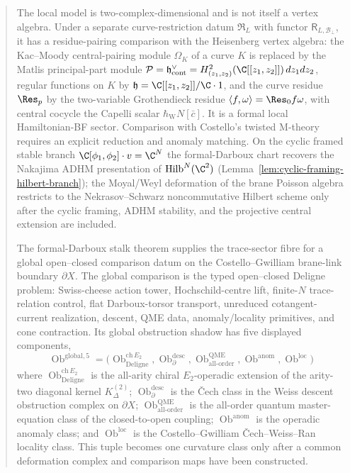 \begin{abstract}
\medskip\noindent
The local model is two-complex-dimensional and is not itself a vertex
algebra.  Under a separate curve-restriction datum
\(\mathfrak R_L\) with functor \(\mathsf R_{L,\mathcal B_\perp}\), it has a
residue-pairing comparison with the Heisenberg vertex algebra: the
Kac--Moody central-pairing module $\Omega_K$ of a curve $K$ is replaced by the Matlis
principal-part module
$\mathcal P=\mathfrak h^\vee_{\mathrm{cont}}=
H^2_{(z_1,z_2)}(\C[[z_1,z_2]])\,dz_1dz_2$, regular functions on $K$
by $\mathfrak h=\C[[z_1,z_2]]/\C\cdot 1$, and the curve residue
$\Res_p$ by the two-variable Grothendieck residue
$\langle f,\omega\rangle=\Res_0 f\omega$, with central cocycle the
Capelli scalar $\hbar_{\mathrm{W}}N[\bar c]$.  It is a formal local
Hamiltonian-BF sector.  Comparison with Costello's twisted M-theory
\cite{costello-twistedM} requires an explicit reduction and anomaly
matching.  On the cyclic framed stable branch
$\C[\phi_1,\phi_2]\cdot v=\C^N$ the formal-Darboux chart recovers
the Nakajima ADHM presentation of $\mathrm{Hilb}^N(\C^2)$
(Lemma~\ref{lem:cyclic-framing-hilbert-branch}); the Moyal/Weyl
deformation of the brane Poisson algebra restricts to the
Nekrasov--Schwarz noncommutative Hilbert scheme
\cite{nekrasov-schwarz-noncommutative} only after the cyclic framing,
ADHM stability, and the projective central extension are included.

\medskip\noindent
The formal-Darboux stalk theorem supplies the trace-sector fibre for a
global open--closed comparison datum on the Costello--Gwilliam
brane-link boundary \(\partial X\).  The global comparison is the typed
open--closed Deligne problem: Swiss-cheese action tower,
Hochschild-centre lift, finite-\(N\) trace-relation control, flat
Darboux-torsor transport, unreduced cotangent-current realization,
descent, QME data, anomaly/locality primitives, and cone contraction.
Its global obstruction shadow has five displayed components,
\[
  \operatorname{Ob}^{\mathrm{global},5}=
  \bigl(
  \operatorname{Ob}^{\mathrm{ch}\,E_2}_{\mathrm{Deligne}},
  \operatorname{Ob}^{\mathrm{desc}}_{\partial},
  \operatorname{Ob}^{\mathrm{QME}}_{\mathrm{all\mbox{-}order}},
  \operatorname{Ob}^{\mathrm{anom}},
  \operatorname{Ob}^{\mathrm{loc}}
  \bigr)
\]
where \(\operatorname{Ob}^{\mathrm{ch}\,E_2}_{\mathrm{Deligne}}\)
is the all-arity chiral \(E_2\)-operadic extension of the arity-two
diagonal kernel \(K^{(2)}_\Delta\);
\(\operatorname{Ob}^{\mathrm{desc}}_{\partial}\) is the Čech class in
the Weiss descent obstruction complex on \(\partial X\);
$\operatorname{Ob}^{\mathrm{QME}}_{\mathrm{all\mbox{-}order}}$ is the
all-order quantum master-equation class of the closed-to-open coupling;
\(\operatorname{Ob}^{\mathrm{anom}}\) is the operadic anomaly class; and
\(\operatorname{Ob}^{\mathrm{loc}}\) is the Costello--Gwilliam
\v{C}ech--Weiss--Ran locality class.
This tuple becomes one curvature class only after a common
deformation complex and comparison maps have been constructed.


\end{abstract}
